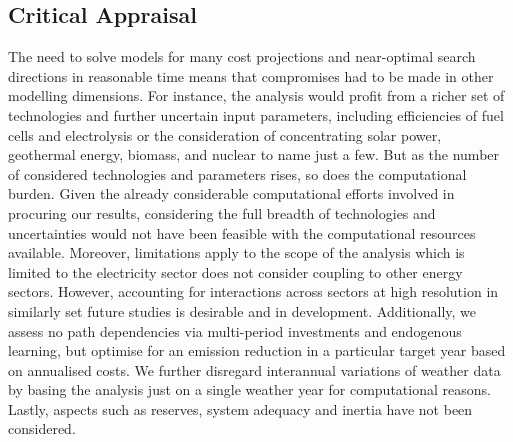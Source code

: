 \subsection{Critical Appraisal}

The need to solve models for many cost projections and near-optimal search
directions in reasonable time means that compromises had to be made in other
modelling dimensions. For instance, the analysis would profit from a richer set
of technologies and further uncertain input parameters, including efficiencies
of fuel cells and electrolysis or the consideration of concentrating solar
power, geothermal energy, biomass, and nuclear to name just a few. But as the
number of considered technologies and parameters rises, so does the
computational burden. Given the already considerable computational efforts
involved in procuring our results, considering the full breadth of technologies
and uncertainties would not have been feasible with the computational resources
available. Moreover, limitations apply to the scope of the analysis which is
limited to the electricity sector does not consider coupling to other energy
sectors. However, accounting for interactions across sectors at high resolution
in similarly set future studies is desirable and in development. Additionally,
we assess no path dependencies via multi-period investments and endogenous
learning, but optimise for an emission reduction in a particular target year
based on annualised costs. We further disregard interannual variations of
weather data by basing the analysis just on a single weather year for computational
reasons. Lastly, aspects such as reserves, system adequacy and inertia have not
been considered.

